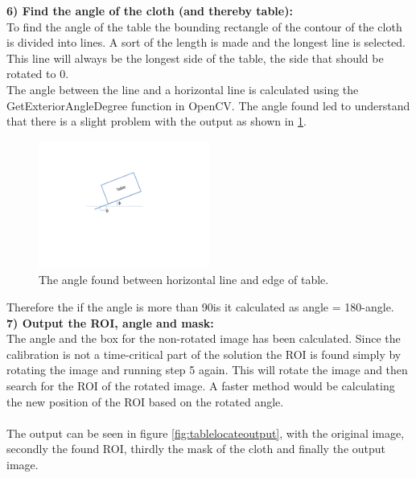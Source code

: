 \textbf{6) Find the angle of the cloth (and thereby table):}\\
To find the angle of the table the bounding rectangle of the contour of the cloth is divided into lines. A sort of the length is made and the longest line is selected. This line will always be the longest side of the table, the side that should be rotated to 0\degree. \\

The angle between the line and a horizontal line is calculated using the GetExteriorAngleDegree function in OpenCV\cite{opencv}. The angle found led to understand that there is a slight problem with the output as shown in \ref{fig:table_angle}.

\begin{figure}[H]
\begin{center}
\leavevmode
\includegraphics[width=0.5\textwidth]{images/table_angle}
\end{center}
\caption{The angle found between horizontal line and edge of table.}
\label{fig:table_angle}
\end{figure}

Therefore the if the angle is more than 90\degree is it calculated as angle = 180\degree-angle.\\

\textbf{7) Output the ROI, angle and mask:}\\
The angle and the box for the non-rotated image has been calculated. Since the calibration is not a time-critical part of the solution the ROI is found simply by rotating the image and running step 5 again.  This will rotate the image and then search for the ROI of the rotated image. A faster method would be calculating the new position of the ROI based on the rotated angle.
\\\\
The output can be seen in figure \ref{fig:tablelocateoutput}, with the original image, secondly the found ROI, thirdly the mask of the cloth and finally the output image.


